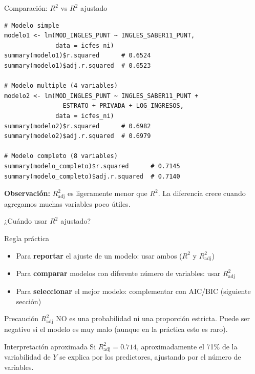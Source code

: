 \documentclass[aspectratio=169, 11pt]{beamer}
\begin{document}
\begin{frame}[fragile]{Comparaci\'on: $R^2$ vs $R^2$ ajustado}
\begin{lstlisting}[basicstyle=\ttfamily\scriptsize]
# Modelo simple
modelo1 <- lm(MOD_INGLES_PUNT ~ INGLES_SABER11_PUNT,
              data = icfes_ni)
summary(modelo1)$r.squared      # 0.6524
summary(modelo1)$adj.r.squared  # 0.6523

# Modelo multiple (4 variables)
modelo2 <- lm(MOD_INGLES_PUNT ~ INGLES_SABER11_PUNT +
                ESTRATO + PRIVADA + LOG_INGRESOS,
              data = icfes_ni)
summary(modelo2)$r.squared      # 0.6982
summary(modelo2)$adj.r.squared  # 0.6979

# Modelo completo (8 variables)
summary(modelo_completo)$r.squared      # 0.7145
summary(modelo_completo)$adj.r.squared  # 0.7140
\end{lstlisting}

\vspace{0.1cm}
{\small \textbf{Observaci\'on:} $R^2_{\text{adj}}$ es ligeramente menor que $R^2$. La diferencia crece cuando agregamos muchas variables poco \'utiles.}
\end{frame}

\begin{frame}{¿Cuándo usar $R^2$ ajustado?}
\begin{block}{Regla práctica}
\begin{itemize}
  \item Para \textbf{reportar} el ajuste de un modelo: usar ambos ($R^2$ y $R^2_{\text{adj}}$)
  \item Para \textbf{comparar} modelos con diferente número de variables: usar $R^2_{\text{adj}}$
  \item Para \textbf{seleccionar} el mejor modelo: complementar con AIC/BIC (siguiente sección)
\end{itemize}
\end{block}

\vspace{0.2cm}
\begin{alertblock}{Precaución}
$R^2_{\text{adj}}$ NO es una probabilidad ni una proporción estricta. Puede ser negativo si el modelo es muy malo (aunque en la práctica esto es raro).
\end{alertblock}

\vspace{0.2cm}
\begin{exampleblock}{Interpretación aproximada}
Si $R^2_{\text{adj}} = 0.714$, aproximadamente el 71\% de la variabilidad de $Y$ se explica por los predictores, ajustando por el número de variables.
\end{exampleblock}
\end{frame}
\end{document}
